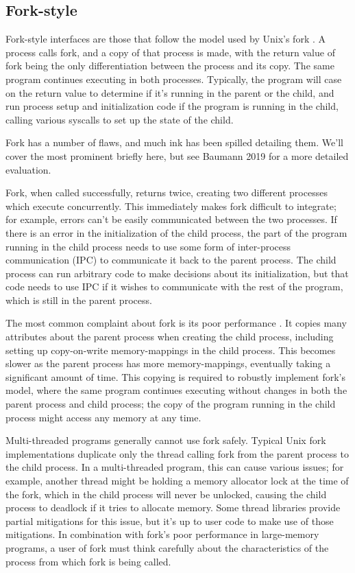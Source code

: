 \documentclass{acmart}
\begin{document}
\subsection{Fork-style}
Fork-style interfaces are those that follow the model used by Unix's fork \cite{forkhist}.
A process calls fork, and a copy of that process is made,
with the return value of fork being the only differentiation between the process and its copy.
The same program continues executing in both processes.
Typically, the program will case on the return value to determine if it's running in the parent or the child,
and run process setup and initialization code if the program is running in the child,
calling various syscalls to set up the state of the child.

Fork has a number of flaws,
and much ink has been spilled detailing them.
We'll cover the most prominent briefly here,
but see Baumann 2019 \cite{forkroad} for a more detailed evaluation.

Fork, when called successfully, returns twice,
creating two different processes which execute concurrently.
This immediately makes fork difficult to integrate;
for example, errors can't be easily communicated between the two processes.
If there is an error in the initialization of the child process,
the part of the program running in the child process
needs to use some form of inter-process communication (IPC) to communicate it back to the parent process.
The child process can run arbitrary code to make decisions about its initialization,
but that code needs to use IPC if it wishes to communicate with the rest of the program,
which is still in the parent process.

The most common complaint about fork is its poor performance \cite{forkroad}.
It copies many attributes about the parent process when creating the child process,
including setting up copy-on-write memory-mappings in the child process.
This becomes slower as the parent process has more memory-mappings,
eventually taking a significant amount of time.
This copying is required to robustly implement fork's model,
where the same program continues executing without changes in both the parent process and child process;
the copy of the program running in the child process might access any memory at any time.

Multi-threaded programs generally cannot use fork safely.
Typical Unix fork implementations duplicate only the thread calling fork from the parent process to the child process.
In a multi-threaded program, this can cause various issues;
for example, another thread might be holding a memory allocator lock at the time of the fork,
which in the child process will never be unlocked,
causing the child process to deadlock if it tries to allocate memory.
Some thread libraries provide partial mitigations for this issue,
but it's up to user code to make use of those mitigations.
In combination with fork's poor performance in large-memory programs,
a user of fork must think carefully
about the characteristics of the process from which fork is being called.
\end{document}
